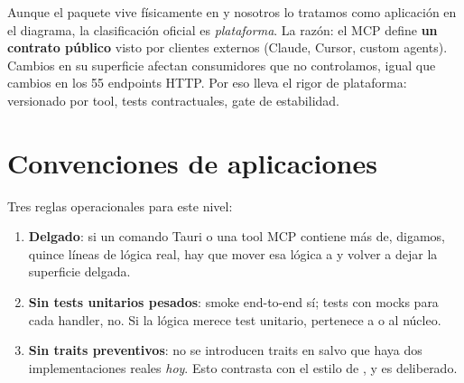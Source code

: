 Aunque el paquete vive físicamente en  y
nosotros lo tratamos como aplicación en el diagrama, la
clasificación oficial es \emph{plataforma}. La razón: el MCP
define \textbf{un contrato público} visto por clientes externos
(Claude, Cursor, custom agents). Cambios en su superficie afectan
consumidores que no controlamos, igual que cambios en los 55
endpoints HTTP. Por eso lleva el rigor de plataforma: versionado
por tool, tests contractuales, gate de estabilidad.

\section{Convenciones de aplicaciones}

Tres reglas operacionales para este nivel:

\begin{enumerate}
    \item \textbf{Delgado}: si un comando Tauri o una tool MCP
    contiene más de, digamos, quince líneas de lógica real, hay que
    mover esa lógica a  y volver a dejar la
    superficie delgada.
    \item \textbf{Sin tests unitarios pesados}: smoke end-to-end
    sí; tests con mocks para cada handler, no. Si la lógica merece
    test unitario, pertenece a  o al núcleo.
    \item \textbf{Sin traits preventivos}: no se introducen traits
    en  salvo que haya dos implementaciones reales
    \emph{hoy}. Esto contrasta con el estilo de
    , y es deliberado.
\end{enumerate}
